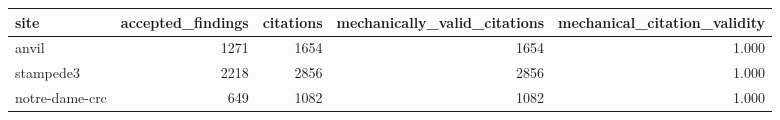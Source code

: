 \begin{tabular}{lrrrr}
\toprule
site & accepted_findings & citations & mechanically_valid_citations & mechanical_citation_validity \\
\midrule
anvil & 1271 & 1654 & 1654 & 1.000 \\
stampede3 & 2218 & 2856 & 2856 & 1.000 \\
notre-dame-crc & 649 & 1082 & 1082 & 1.000 \\
\bottomrule
\end{tabular}
